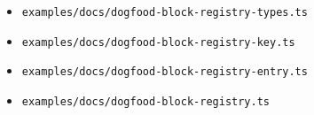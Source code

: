 \begin{itemize}
  \begin{itemize}
  \tightlist
  \item
    \texttt{e\allowbreak{}x\allowbreak{}a\allowbreak{}m\allowbreak{}p\allowbreak{}l\allowbreak{}e\allowbreak{}s\allowbreak{}/\allowbreak{}d\allowbreak{}o\allowbreak{}c\allowbreak{}s\allowbreak{}/\allowbreak{}d\allowbreak{}o\allowbreak{}g\allowbreak{}f\allowbreak{}o\allowbreak{}o\allowbreak{}d\allowbreak{}-\allowbreak{}b\allowbreak{}l\allowbreak{}o\allowbreak{}c\allowbreak{}k\allowbreak{}-\allowbreak{}r\allowbreak{}e\allowbreak{}g\allowbreak{}i\allowbreak{}s\allowbreak{}t\allowbreak{}r\allowbreak{}y\allowbreak{}-\allowbreak{}t\allowbreak{}y\allowbreak{}p\allowbreak{}e\allowbreak{}s\allowbreak{}.\allowbreak{}t\allowbreak{}s}
  \item
    \texttt{e\allowbreak{}x\allowbreak{}a\allowbreak{}m\allowbreak{}p\allowbreak{}l\allowbreak{}e\allowbreak{}s\allowbreak{}/\allowbreak{}d\allowbreak{}o\allowbreak{}c\allowbreak{}s\allowbreak{}/\allowbreak{}d\allowbreak{}o\allowbreak{}g\allowbreak{}f\allowbreak{}o\allowbreak{}o\allowbreak{}d\allowbreak{}-\allowbreak{}b\allowbreak{}l\allowbreak{}o\allowbreak{}c\allowbreak{}k\allowbreak{}-\allowbreak{}r\allowbreak{}e\allowbreak{}g\allowbreak{}i\allowbreak{}s\allowbreak{}t\allowbreak{}r\allowbreak{}y\allowbreak{}-\allowbreak{}k\allowbreak{}e\allowbreak{}y\allowbreak{}.\allowbreak{}t\allowbreak{}s}
  \item
    \texttt{e\allowbreak{}x\allowbreak{}a\allowbreak{}m\allowbreak{}p\allowbreak{}l\allowbreak{}e\allowbreak{}s\allowbreak{}/\allowbreak{}d\allowbreak{}o\allowbreak{}c\allowbreak{}s\allowbreak{}/\allowbreak{}d\allowbreak{}o\allowbreak{}g\allowbreak{}f\allowbreak{}o\allowbreak{}o\allowbreak{}d\allowbreak{}-\allowbreak{}b\allowbreak{}l\allowbreak{}o\allowbreak{}c\allowbreak{}k\allowbreak{}-\allowbreak{}r\allowbreak{}e\allowbreak{}g\allowbreak{}i\allowbreak{}s\allowbreak{}t\allowbreak{}r\allowbreak{}y\allowbreak{}-\allowbreak{}e\allowbreak{}n\allowbreak{}t\allowbreak{}r\allowbreak{}y\allowbreak{}.\allowbreak{}t\allowbreak{}s}
  \item
    \texttt{e\allowbreak{}x\allowbreak{}a\allowbreak{}m\allowbreak{}p\allowbreak{}l\allowbreak{}e\allowbreak{}s\allowbreak{}/\allowbreak{}d\allowbreak{}o\allowbreak{}c\allowbreak{}s\allowbreak{}/\allowbreak{}d\allowbreak{}o\allowbreak{}g\allowbreak{}f\allowbreak{}o\allowbreak{}o\allowbreak{}d\allowbreak{}-\allowbreak{}b\allowbreak{}l\allowbreak{}o\allowbreak{}c\allowbreak{}k\allowbreak{}-\allowbreak{}r\allowbreak{}e\allowbreak{}g\allowbreak{}i\allowbreak{}s\allowbreak{}t\allowbreak{}r\allowbreak{}y\allowbreak{}.\allowbreak{}t\allowbreak{}s}

\end{itemize}
\end{itemize}
